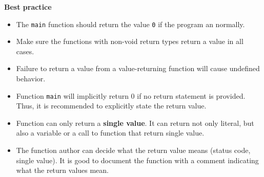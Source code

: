 \documentclass[
  letterpaper,
  DIV=11,
  numbers=noendperiod]{scrreprt}
\providecommand{\tightlist}{%
  \setlength{\itemsep}{0pt}\setlength{\parskip}{0pt}}\usepackage{longtable,booktabs,array}
\begin{document}
\begin{tcolorbox}[enhanced jigsaw, toprule=.15mm, rightrule=.15mm, opacityback=0, breakable, leftrule=.75mm, colback=white, colframe=quarto-callout-tip-color-frame, arc=.35mm, left=2mm, bottomrule=.15mm]
\begin{minipage}[t]{5.5mm}
\textcolor{quarto-callout-tip-color}{\faLightbulb}
\end{minipage}%
\begin{minipage}[t]{\textwidth - 5.5mm}

\textbf{Best practice}\vspace{2mm}

\begin{itemize}
\tightlist
\item
  The \texttt{main} function should return the value \texttt{0} if the
  program an normally.
\item
  Make sure the functions with non-void return types return a value in
  all cases.
\item
  Failure to return a value from a value-returning function will cause
  undefined behavior.
\end{itemize}

\end{minipage}%
\end{tcolorbox}

\begin{tcolorbox}[enhanced jigsaw, toprule=.15mm, rightrule=.15mm, opacityback=0, breakable, leftrule=.75mm, colback=white, colframe=quarto-callout-note-color-frame, arc=.35mm, left=2mm, bottomrule=.15mm]
\begin{minipage}[t]{5.5mm}
\textcolor{quarto-callout-note-color}{\faInfo}
\end{minipage}%
\begin{minipage}[t]{\textwidth - 5.5mm}

\begin{itemize}
\tightlist
\item
  Function \texttt{main} will implicitly return 0 if no return statement
  is provided. Thus, it is recommended to explicitly state the return
  value.
\item
  Function can only return a \textbf{single value}. It can return not
  only literal, but also a variable or a call to function that return
  single value.
\item
  The function author can decide what the return value means (status
  code, single value). It is good to document the function with a
  comment indicating what the return values mean.
\end{itemize}

\end{minipage}%
\end{tcolorbox}
\end{document}
